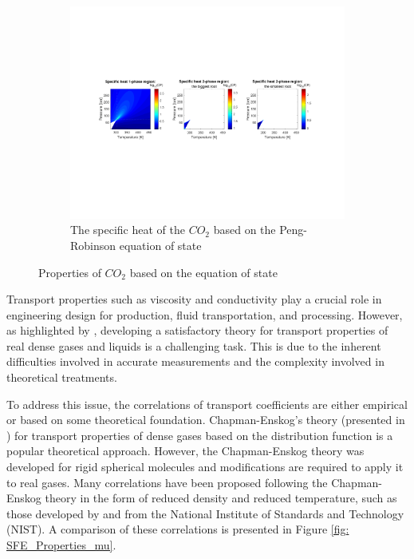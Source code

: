 \documentclass[../Article_Model_Parameters.tex]{subfiles}
\begin{document}
\begin{figure}[H]
\begin{subfigure}[b]{0.31\textwidth}
			\label{fig: SFE_Properties_Density}
		\end{subfigure}
		\hfill
		\begin{subfigure}[b]{0.31\textwidth}
			\centering
			\includegraphics[trim = 2.9cm 8cm 18cm 7cm,clip,width=\textwidth]{Figures/CP.pdf}	
			\caption{The specific heat of the $CO_2$ based on the Peng-Robinson equation of state}
			\label{fig: SFE_Properties_CP}
		\end{subfigure}
		\caption{Properties of $CO_2$ based on the equation of state}
		\label{fig: SFE_Properties}
	\end{figure}    
	
	Transport properties such as viscosity and conductivity play a crucial role in engineering design for production, fluid transportation, and processing. However, as highlighted by \citet{Sheng1989}, developing a satisfactory theory for transport properties of real dense gases and liquids is a challenging task. This is due to the inherent difficulties involved in accurate measurements and the complexity involved in theoretical treatments.
	
	To address this issue, the correlations of transport coefficients are either empirical or based on some theoretical foundation. Chapman-Enskog's theory (presented in \citet{Chapman1991}) for transport properties of dense gases based on the distribution function is a popular theoretical approach. However, the Chapman-Enskog theory was developed for rigid spherical molecules and modifications are required to apply it to real gases. Many correlations have been proposed following the Chapman-Enskog theory in the form of reduced density and reduced temperature, such as those developed by \citet{Fenghour1998} and \citet{Laesecke2017} from the National Institute of Standards and Technology (NIST). A comparison of these correlations is presented in Figure \ref{fig: SFE_Properties_mu}.
	
\end{document}
